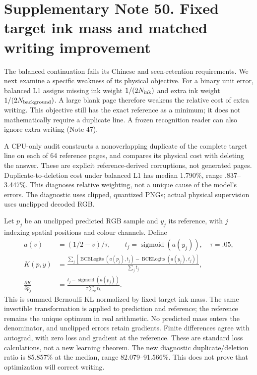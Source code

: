 \clearpage
\section*{Supplementary Note 50. Fixed target ink mass and matched writing improvement}

The balanced continuation fails its Chinese and seen-retention requirements.
We next examine a specific weakness of its physical objective. For a binary
unit error, balanced L1 assigns missing ink weight $1/(2N_{\rm ink})$ and extra
ink weight $1/(2N_{\rm background})$. A large blank page therefore weakens the
relative cost of extra writing. This objective still has the exact reference
as a minimum; it does not mathematically require a duplicate line. A frozen
recognition reader can also ignore extra writing (Note 47).

A CPU-only audit constructs a nonoverlapping duplicate of the complete target
line on each of 64 reference pages, and compares its physical cost with deleting
the answer. These are explicit reference-derived corruptions, not generated
pages. Duplicate-to-deletion cost under balanced L1 has median 1.790\%, range
.837--3.447\%. This diagnoses relative weighting, not a unique cause of the
model's errors. The diagnostic uses clipped, quantized PNGs; actual physical
supervision uses unclipped decoded RGB.

Let $p_j$ be an unclipped predicted RGB sample and $y_j$ its reference, with
$j$ indexing spatial positions and colour channels. Define
\begin{align}
 a(v)&=(1/2-v)/\tau,\qquad t_j=\operatorname{sigmoid}(a(y_j)),\quad \tau=.05,\\
 K(p,y)&=\frac{\sum_j\left[
 \operatorname{BCELogits}(a(p_j),t_j)
 -\operatorname{BCELogits}(a(y_j),t_j)\right]}{\sum_j t_j},\\
 \frac{\partial K}{\partial p_j}
 &=\frac{t_j-\operatorname{sigmoid}(a(p_j))}{\tau\sum_k t_k}.
\end{align}
This is summed Bernoulli KL normalized by fixed target ink mass. The same
invertible transformation is applied to prediction and reference; the
reference remains the unique optimum in real arithmetic. No predicted mass
enters the denominator, and unclipped errors retain gradients. Finite differences
agree with autograd, with zero loss and gradient at the reference. These are
standard loss calculations, not a new learning theorem. The new diagnostic
duplicate/deletion ratio is 85.857\% at the median, range 82.079--91.566\%.
This does not prove that optimization will correct writing.

